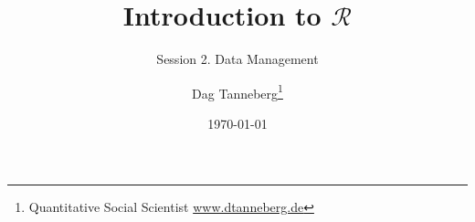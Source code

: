 \usepackage[utf8]{inputenc}
\usepackage{hyperref}
\usepackage{graphicx}
\usepackage{booktabs}

\title{Introduction to $\mathcal{R}$}
\subtitle{Session 2. Data Management}
\author{Dag Tanneberg\thanks{%
    Quantitative Social Scientist
    \href{http://www.dtanneberg.de}{www.dtanneberg.de}
    }
}
\date{\today}
\hypersetup{colorlinks, urlcolor = red, linkcolor = }
